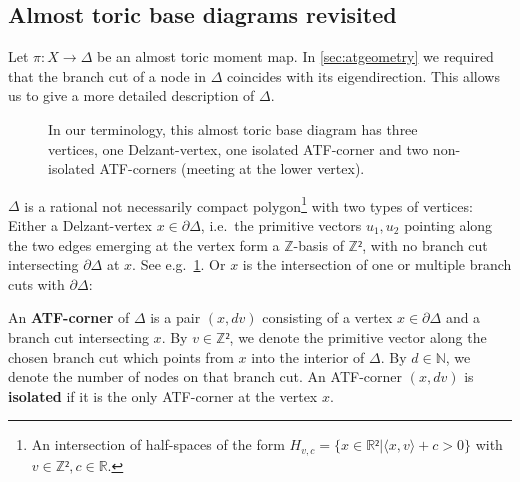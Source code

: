 \documentclass[AIF,Unicode,manuscript]{cedram}
\begin{document}
\subsection{Almost toric base diagrams revisited}
\label{sec:atf_base_diagrams}

Let $π:X → Δ$ be an almost toric moment map.
In \cref{sec:atgeometry} we required that the branch cut of a node in $Δ$ coincides with its eigendirection.
This allows us to give a more detailed description of $Δ$.

\begin{figure}
  \centering
  \caption{In our terminology, this almost toric base diagram has three vertices, one Delzant-vertex, one isolated ATF-corner and two non-isolated ATF-corners (meeting at the lower vertex).}
  \label{fig:atf_example2}
\end{figure}

$Δ$ is a rational not necessarily compact polygon\footnote{An intersection of half-spaces of the form $H_{v,c} = \{x ∈ ℝ² | ⟨x,v⟩+c > 0\}$ with $v ∈ ℤ², c ∈ ℝ$.} with two types of vertices: Either a Delzant-vertex $x ∈ ∂Δ$, i.e.\ the primitive vectors $u_1,u_2$ pointing along the two edges emerging at the vertex form a $ℤ$-basis of $ℤ²$, with no branch cut intersecting $∂Δ$ at $x$. See e.g.\ \cref{fig:atf_example2}.
Or $x$ is the intersection of one or multiple branch cuts with $∂Δ$:

\begin{definition}
  \label{def:atf_corner}
  An \textbf{ATF-corner} of $Δ$ is a pair $(x,dv)$ consisting of a vertex $x ∈ ∂Δ$ and a branch cut intersecting $x$.
  By $v ∈ ℤ²$, we denote the primitive vector along the chosen branch cut which points from $x$ into the interior of $\Delta$.
  By $d \in \mathbb{N}$, we denote the number of nodes on that branch cut.
An ATF-corner $(x,dv)$ is \textbf{isolated} if it is the only ATF-corner at the vertex $x$. 
\end{definition}
\end{document}
